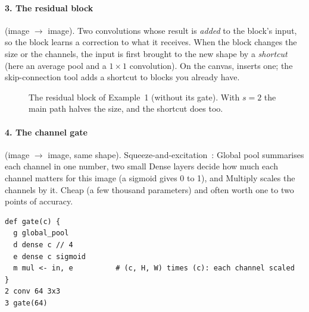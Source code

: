 \paragraph{3. The residual block} (image $\rightarrow$ image). Two convolutions whose result is \emph{added} to the block's input, so the
block learns a correction to what it receives. When the block changes the size or the channels, the input is first brought to the new
shape by a \emph{shortcut} (here an average pool and a $1\times1$ convolution). On the canvas,  inserts
one; the skip-connection tool adds a shortcut to blocks you already have.
\begin{figure}[htbp]\centering
{}
\caption{The residual block of Example~1 (without its gate). With $s=2$ the main path halves the size, and the shortcut does too.}
\label{fig:build-res}
\end{figure}

\paragraph{4. The channel gate} (image $\rightarrow$ image, same shape). Squeeze-and-excitation~\cite{hu2017senet}: Global pool
summarises each channel in one number, two small Dense layers decide how much each channel matters for this image (a sigmoid gives 0 to 1),
and Multiply scales the channels by it. Cheap (a few thousand parameters) and often worth one to two points of accuracy.
\begin{verbatim}
def gate(c) {
  g global_pool
  d dense c // 4
  e dense c sigmoid
  m mul <- in, e          # (c, H, W) times (c): each channel scaled
}
2 conv 64 3x3
3 gate(64)
\end{verbatim}

